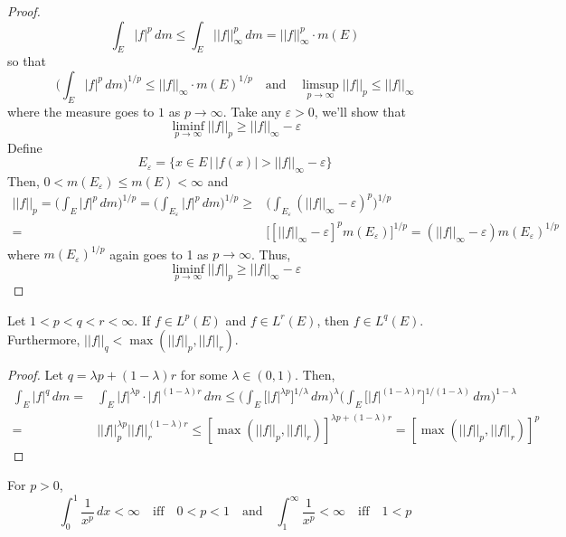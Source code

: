 \begin{proof}
\[\int _{E}|f|^{p}\,d m\leq \int _{E}||f||^{p}_{\infty }\,d m=||f||^{p}_{\infty }\cdot m(E)\]
so that 
\[\Big(\int _{E}|f|^{p}\,d m\Big)^{1/p}\leq ||f||_{\infty }\cdot m(E)^{1/p}\quad \mathrm{and}\quad \limsup_{p\rightarrow \infty }||f||_{p}\leq ||f||_{\infty } \]
where the measure goes to $1$ as $p\rightarrow \infty $. Take any $\varepsilon >0$, we'll show that 
\[\liminf_{p\rightarrow \infty }||f||_{p}\geq ||f||_{\infty }-\varepsilon \]
Define
\[E_{\varepsilon }=\{x\in E \,|\, |f(x)|>||f||_{\infty }-\varepsilon \}\]
Then, $0<m(E_{\varepsilon })\leq m(E)<\infty $ and
\begin{align*}
||f||_{p}=\Big(\int _{E}|f|^{p}\,d m\Big)^{1/p}=\Big(\int _{E_{\varepsilon }}|f|^{p}\,d m\Big)^{1/p}\geq& \Big(\int _{E_{\varepsilon }}(||f||_{\infty }-\varepsilon )^{p}\Big)^{1/p}\\
=&\Big[[||f||_{\infty }-\varepsilon ]^{p}m(E_{\varepsilon })\Big]^{1/p}=(||f||_{\infty }-\varepsilon )m(E_{\varepsilon })^{1/p}
\end{align*}
where $m(E_{\varepsilon })^{1/p}$ again goes to 1 as $p\rightarrow \infty $. Thus,
\[\liminf_{p\rightarrow \infty }||f||_{p}\geq ||f||_{\infty }-\varepsilon \]
\end{proof}
\vspace{2ex}
\begin{thm}
Let $1<p<q<r<\infty $. If $f\in L^{p}(E)$ and $f\in L^{r}(E)$, then $f\in L^{q}(E)$. Furthermore, $||f||_{q}<\max (||f||_{p},||f||_{r})$. 
\end{thm}
\vspace{2ex}
\begin{proof}
Let $q=\lambda p+(1-\lambda )r$ for some $\lambda \in (0,1)$. Then,
\begin{align*}
\int _{E}|f|^{q}\,d m=&\int _{E}|f|^{\lambda p}\cdot |f|^{(1-\lambda )r}\,d m\leq \Big(\int _{E}\Big[|f|^{\lambda p}\Big]^{1/\lambda }\,d m\Big)^{\lambda }\Big(\int _{E}\Big[|f|^{(1-\lambda )r}\Big]^{1/(1-\lambda )}\,d m\Big)^{1-\lambda }
\\=&||f||^{\lambda p}_{p}||f||_{r}^{(1-\lambda )r}\leq [\max(||f||_{p},||f||_{r})]^{\lambda p+(1-\lambda )r}=[\max(||f||_{p},||f||_{r})]^{p}
\end{align*}
\end{proof}
\vspace{2ex}
\begin{rmk}
For $p>0$, 
\[
\int ^{1}_{0}\dfrac{1}{x^{p}}\,dx<\infty \quad\mathrm{iff}\quad0<p<1\quad \mathrm{and}\quad
\int ^{\infty }_{1}\dfrac{1}{x^{p}}<\infty \quad \mathrm{iff}\quad1<p
\]
\end{rmk}
